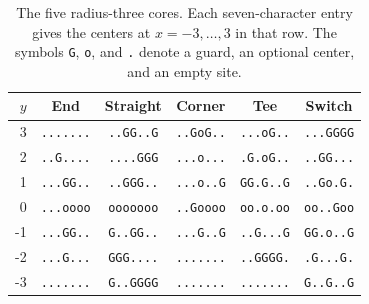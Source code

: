 \begin{table}[ht]
\centering
\begin{tabular}{rccccc}
\toprule
$y$ & End & Straight & Corner & Tee & Switch \\
\midrule
3 & \texttt{.......} & \texttt{..GG..G} & \texttt{..GoG..} & \texttt{...oG..} & \texttt{...GGGG} \\
2 & \texttt{..G....} & \texttt{....GGG} & \texttt{...o...} & \texttt{.G.oG..} & \texttt{..GG...} \\
1 & \texttt{...GG..} & \texttt{..GGG..} & \texttt{...o..G} & \texttt{GG.G..G} & \texttt{..Go.G.} \\
0 & \texttt{...oooo} & \texttt{ooooooo} & \texttt{..Goooo} & \texttt{oo.o.oo} & \texttt{oo..Goo} \\
-1 & \texttt{...GG..} & \texttt{G..GG..} & \texttt{...G..G} & \texttt{..G...G} & \texttt{GG.o..G} \\
-2 & \texttt{...G...} & \texttt{GGG....} & \texttt{.......} & \texttt{..GGGG.} & \texttt{.G...G.} \\
-3 & \texttt{.......} & \texttt{G..GGGG} & \texttt{.......} & \texttt{.......} & \texttt{G..G..G} \\
\bottomrule
\end{tabular}
\caption{The five radius-three cores. Each seven-character entry gives the centers at $x=-3,\ldots,3$ in that row. The symbols \texttt{G}, \texttt{o}, and \texttt{.} denote a guard, an optional center, and an empty site.}\label{tab:cores}
\end{table}
